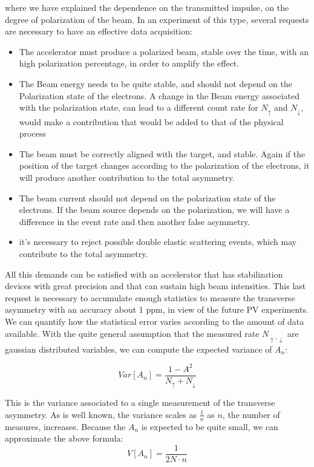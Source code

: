 where we have explained the dependence on the transmitted impulse, on the degree of polarization of the beam.
In an experiment of this type, several requests are necessary to have an effective data acquisition:

\begin{itemize}
\item The accelerator must produce a polarized beam, stable over the time, with an high polarization percentage, in order to amplify the effect.
\item The Beam energy needs to be quite stable, and should not depend on the Polarization state of the electrons. A change in the Beam energy associated with the polarization state, can lead to a different count rate for $N_{\uparrow}$ and $N_{\downarrow}$, would make a contribution that would be added to that of the physical process
\item The beam must be correctly aligned with the target, and stable. Again if the position of the target changes according to the polarization of the electrons, it will produce another contribution to the total asymmetry.
\item The beam current should not depend on the polarization state of the electrons. If the beam source depends on the polarization, we will have a difference in the event rate and then another false asymmetry.
\item it's necessary to reject possible double elastic scattering events, which may contribute to the total asymmetry. 
\end{itemize}

All this demands can be satisfied with an accelerator that has stabilization devices with great precision and that can sustain high beam intensities. This last request is necessary to accumulate enough statistics to measure the transverse asymmetry with an accuracy about 1 ppm, in view of the future PV experiments. We can quantify how the statistical error varies according to the amount of data available. With the quite general assumption that the measured rate $N_{\uparrow,\downarrow}$ are gaussian distributed variables, we can compute the expected variance of $A_{n}$:

\begin{equation}
Var[A_{n}] = \dfrac{1 - A^{2}}{N_{\uparrow} + N_{\downarrow}} 
\end{equation}

This is the variance associated to a single measurement of the transverse asymmetry. As is well known, the variance scales as 
$\frac{1}{n}$ as $n$, the number of measures, increases.
Because the $A_{n}$ is expected to be quite small, we can approximate the above formula:
\begin{equation} 
V[A_{n}] = \dfrac{1}{2N \cdot n}  \label{eq:Error}
\end{equation}

